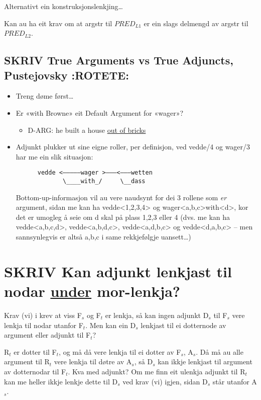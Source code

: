 \documentclass[11pt,a4paper,oneside,draft]{book}
\begin{document}
Alternativt ein konstruksjonslenkjing\ldots{} 

Kan au ha eit krav om at argstr til $PRED_{L1}$ er ein slags delmengd av
argstr til $PRED_{L2}$. 
\subsection{\textbf{SKRIV} True Arguments vs True Adjuncts, Pustejovsky \textbf{:ROTETE:}}
\label{sec-3.15.7}

\begin{itemize}
\item Treng døme først\ldots{}
\item Er «with Browne» eit Default Argument for «wager»?

\begin{itemize}
\item D-ARG: he built a house \underline{out of bricks}
\end{itemize}

\item Adjunkt plukker ut sine eigne roller, per definisjon, ved
     vedde/4 og wager/3 har me ein slik situasjon:
\begin{verbatim}
      vedde <—————wager >———<———wetten
             \____with_/     \__dass
\end{verbatim}

     Bottom-up-informasjon vil au vere naudsynt for dei 3 rollene
     som \emph{er} argument, sidan me kan ha vedde<1,2,3,4> og
     wager<a,b,c>with<d>, kor det er umogleg å seie om d skal på plass
     1,2,3 eller 4 (dvs. me kan ha vedde<a,b,c,d>, vedde<a,b,d,c>,
     vedde<a,d,b,c> og vedde<d,a,b,c> -- men sannsynlegvis er altså
     a,b,c i same rekkjefølgje uansett\ldots{})
\end{itemize}
\section{\textbf{SKRIV} Kan adjunkt lenkjast til nodar \underline{under} mor-lenkja?}
\label{sec-3.16}

Krav (vi) i \citet[s.~75]{dyvik2009lmp} krev at viss F$_s$ og F$_t$ er
lenkja, så kan ingen adjunkt D$_s$ til F$_s$ vere lenkja til nodar utanfor
F$_t$. Men kan ein D$_s$ lenkjast til ei dotternode av argument eller
adjunkt til F$_t$?

R$_t$ er dotter til F$_t$, og må då vere lenkja til ei dotter av F$_s$,
A$_s$. Då må au alle argument til R$_t$ vere lenkja til døtre av A$_s$, så
D$_s$ kan ikkje lenkjast til argument av dotternodar til F$_t$. Kva med
adjunkt? Om me finn eit ulenkja adjunkt til R$_t$ kan me heller ikkje
lenkje dette til D$_s$ ved krav (vi) igjen, sidan D$_s$ står utanfor
A$_s$.
\end{document}
